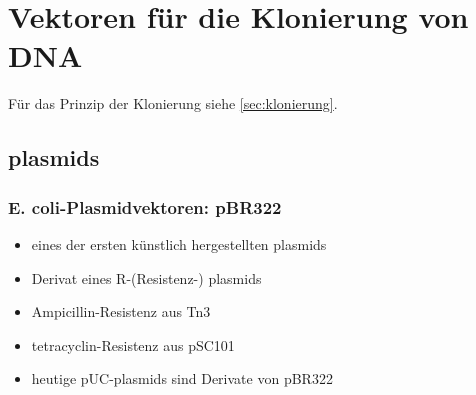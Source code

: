 

\section{Vektoren für die Klonierung von DNA}
Für das Prinzip der Klonierung siehe \ref{sec:klonierung}. 
\subsection{\glspl{plasmid}}
\subsubsection{E. coli-Plasmidvektoren: pBR322} 
\begin{itemize}
\item eines der ersten künstlich hergestellten \glspl{plasmid}
    \item Derivat eines R-(Resistenz-) \gls{plasmid}s
    \item Ampicillin-Resistenz aus Tn3
    \item \gls{tetracyclin}-Resistenz aus pSC101
    \item heutige pUC-\glspl{plasmid} sind Derivate von pBR322  
\end{itemize}
